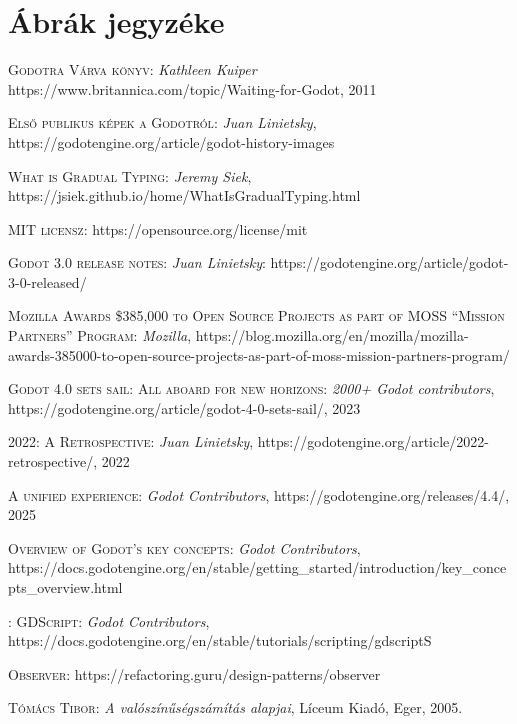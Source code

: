 \documentclass[
]{thesis-ekf}
\theoremstyle{definition}
\theoremstyle{remark}
\begin{document}
\chapter{Ábrák jegyzéke}
\begin{thebibliography}{2}
	
	\textsc{Godotra Várva könyv}: \emph{Kathleen Kuiper} https://www.britannica.com/topic/Waiting-for-Godot, 2011
	
	\textsc{Első publikus képek a Godotról}:  \emph{Juan Linietsky}, https://godotengine.org/article/godot-history-images
	
	\textsc{What is Gradual Typing}: \emph{Jeremy Siek}, https://jsiek.github.io/home/WhatIsGradualTyping.html
	
	\textsc{MIT licensz}: https://opensource.org/license/mit
	
	\textsc{Godot 3.0 release notes}: \emph{Juan Linietsky}: https://godotengine.org/article/godot-3-0-released/
	
	\textsc{Mozilla Awards \$385,000 to Open Source Projects as part of MOSS “Mission Partners” Program}: \emph{Mozilla}, https://blog.mozilla.org/en/mozilla/mozilla-awards-385000-to-open-source-projects-as-part-of-moss-mission-partners-program/
	
	
	\textsc{Godot 4.0 sets sail: All aboard for new horizons}: \emph{2000+ Godot contributors}, https://godotengine.org/article/godot-4-0-sets-sail/, 2023
	
	\textsc{2022: A Retrospective}: \emph{Juan Linietsky}, https://godotengine.org/article/2022-retrospective/, 2022
	
	\textsc{A unified experience}: \emph{Godot Contributors}, https://godotengine.org/releases/4.4/, 2025
	
	\textsc{Overview of Godot's key concepts}: \emph{Godot Contributors}, https://docs.godotengine.org/en/stable/getting\_started/introduction/key\_concepts\_overview.html
	
	: 
	\textsc{GDScript}: \emph{Godot Contributors}, https://docs.godotengine.org/en/stable/tutorials/scripting/gdscriptS
	
	\textsc{Observer}: https://refactoring.guru/design-patterns/observer
	
	\textsc{Tómács Tibor}: \emph{A valószínűségszámítás alapjai}, Líceum Kiadó, Eger, 2005.
\end{thebibliography}
\end{document}

